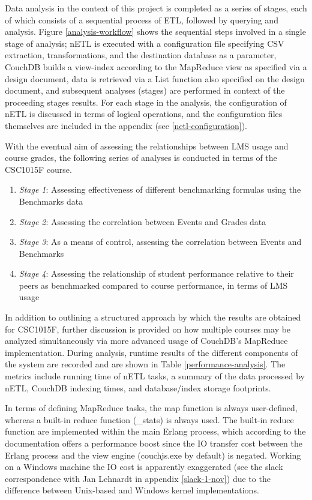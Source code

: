 Data analysis in the context of this project is completed as a series of stages, each of which consists of a sequential process of ETL, followed by querying and analysis. Figure \ref{analysis-workflow} shows the sequential steps involved in a single stage of analysis; nETL is executed with a configuration file specifying CSV extraction, transformations, and the destination database as a parameter, CouchDB builds a view-index according to the MapReduce view as specified via a design document, data is retrieved via a List function also specified on the design document, and subsequent analyses (stages) are performed in context of the proceeding stages results. For each stage in the analysis, the configuration of nETL is discussed in terms of logical operations, and the configuration files themselves are included in the appendix (see \ref{netl-configuration}).

With the eventual aim of assessing the relationships between LMS usage and course grades, the following series of analyses is conducted in terms of the CSC1015F course.

\begin{enumerate}
    \item \textit{Stage 1}: Assessing effectiveness of different benchmarking formulas using the Benchmarks data
    \item \textit{Stage 2}: Assessing the correlation between Events and Grades data
    \item \textit{Stage 3}: As a means of control, assessing the correlation between Events and Benchmarks
    \item \textit{Stage 4}: Assessing the relationship of student performance relative to their peers as benchmarked compared to course performance, in terms of LMS usage
\end{enumerate}


In addition to outlining a structured approach by which the results are obtained for CSC1015F, further discussion is provided on how multiple courses may be analyzed simultaneously via more advanced usage of CouchDB's MapReduce implementation. During analysis, runtime results of the different components of the system are recorded and are shown in Table \ref{performance-analysis}. The metrics include running time of nETL tasks, a summary of the data processed by nETL, CouchDB indexing times, and database/index storage footprints.

In terms of defining MapReduce tasks, the map function is always user-defined, whereas a built-in reduce function (\_stats) is always used. The built-in reduce function are implemented within the main Erlang process, which according to the documentation offers a performance boost since the IO transfer cost between the Erlang process and the view engine (couchjs.exe by default) is negated. Working on a Windows machine the IO cost is apparently exaggerated (see the slack correspondence with Jan Lehnardt in appendix \ref{slack-1-nov}) due to the difference between Unix-based and Windows kernel implementations.

